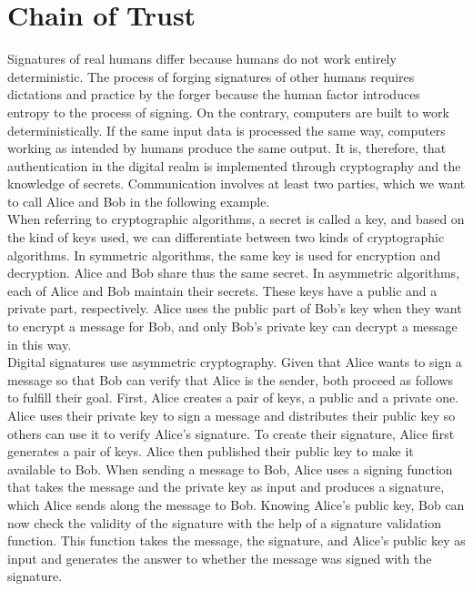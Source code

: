 \section{Chain of Trust}
\label{sec:20:chain_of_trust}
Signatures of real humans differ because humans do not work entirely
deterministic. The process of forging signatures of other humans requires
dictations and practice by the forger because the human factor introduces
entropy to the process of signing. On the contrary, computers are built to work
deterministically. If the same input data is processed the same way, computers
working as intended by humans produce the same output. It is, therefore, that
authentication in the digital realm is implemented through cryptography and the
knowledge of secrets. Communication involves at least two parties, which we want
to call Alice and Bob in the following example.\\

When referring to cryptographic algorithms, a secret is called a key, and based
on the kind of keys used, we can differentiate between two kinds of
cryptographic algorithms. In symmetric algorithms, the same key is used for
encryption and decryption. Alice and Bob share thus the same secret. In
asymmetric algorithms, each of Alice and Bob maintain their secrets. These keys
have a public and a private part, respectively. Alice uses the public part of
Bob's key when they want to encrypt a message for Bob, and only Bob's private
key can decrypt a message in this way.\\

Digital signatures use asymmetric cryptography. Given that Alice wants to sign a
message so that Bob can verify that Alice is the sender, both proceed as follows
to fulfill their goal. First, Alice creates a pair of keys, a public and a
private one. Alice uses their private key to sign a message and distributes
their public key so others can use it to verify Alice's signature. To create
their signature, Alice first generates a pair of keys. Alice then published
their public key to make it available to Bob. When sending a message to Bob,
Alice uses a signing function that takes the message and the private key as
input and produces a signature, which Alice sends along the message to Bob.
Knowing Alice's public key, Bob can now check the validity of the signature with
the help of a signature validation function. This function takes the message,
the signature, and Alice's public key as input and generates the answer to
whether the message was signed with the signature.\\

